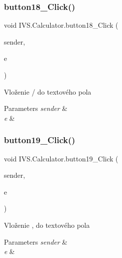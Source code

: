 \subsubsection{\texorpdfstring{button18\+\_\+\+Click()}{button18\_Click()}}
{\footnotesize\ttfamily void I\+V\+S.\+Calculator.\+button18\+\_\+\+Click (\begin{DoxyParamCaption}\item[{object}]{sender,  }\item[{Event\+Args}]{e }\end{DoxyParamCaption})\hspace{0.3cm}{\ttfamily [protected]}}



Vloženie \textquotesingle{}/\textquotesingle{} do textového pola 


\begin{DoxyParams}{Parameters}
{\em sender} & \\
\hline
{\em e} & \\
\hline
\end{DoxyParams}
\mbox{\label{class_i_v_s_1_1_calculator_a2ec5538328f39267ddd848fbc9200de7}} 
\subsubsection{\texorpdfstring{button19\+\_\+\+Click()}{button19\_Click()}}
{\footnotesize\ttfamily void I\+V\+S.\+Calculator.\+button19\+\_\+\+Click (\begin{DoxyParamCaption}\item[{object}]{sender,  }\item[{Event\+Args}]{e }\end{DoxyParamCaption})\hspace{0.3cm}{\ttfamily [protected]}}



Vloženie \textquotesingle{},\textquotesingle{} do textového pola 


\begin{DoxyParams}{Parameters}
{\em sender} & \\
\hline
{\em e} & \\
\hline
\end{DoxyParams}
\mbox{\label{class_i_v_s_1_1_calculator_acb35f01364be2f89cd6615bfe6b90725}} 
